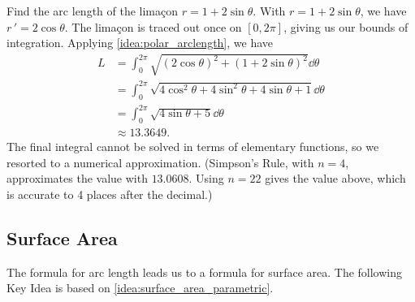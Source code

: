 \begin{example}\label{ex_polcalc7}
Find the arc length of the limaçon $r=1+2\sin\theta$.
\solution
With $r=1+2\sin\theta$, we have $r\,' = 2\cos\theta$. The limaçon is traced out once on $[0,2\pi]$, giving us our bounds of integration. Applying \autoref{idea:polar_arclength}, we have
\begin{align*}
	L
	&= \int_0^{2\pi} \sqrt{(2\cos\theta)^2+(1+2\sin\theta)^2}\dd\theta \\
	&=	\int_0^{2\pi} \sqrt{4\cos^2\theta+4\sin^2\theta +4\sin\theta+1}\dd\theta\\
	&=	\int_0^{2\pi} \sqrt{4\sin\theta+5}\dd\theta\\
	&\approx 13.3649.
\end{align*}
%
%
The final integral cannot be solved in terms of elementary functions, so we resorted to a numerical approximation. (Simpson's Rule, with $n=4$, approximates the value with $13.0608$. Using $n=22$ gives the value above, which is accurate to 4 places after the decimal.)
\end{example}

\subsection{Surface Area}

The formula for arc length leads us to a formula for surface area. The following Key Idea is based on \autoref{idea:surface_area_parametric}.

